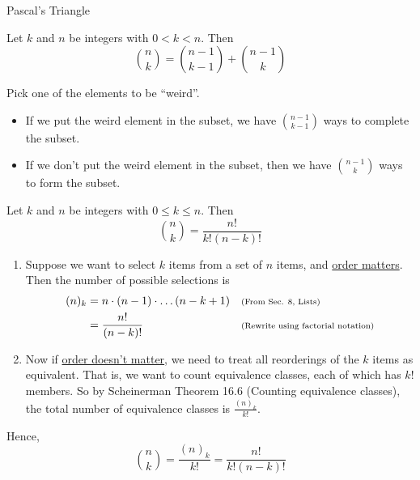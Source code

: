 \documentclass[10pt]{beamer}
\begin{document}
\begin{frame}{Pascal's Triangle}
\footnotesize 
\begin{mygreenbox}[title=\text{Pascal's Identity}]
Let $k$ and $n$ be integers with $0 < k <n$. Then
\[ \binom{n}{k} =\binom{n-1}{k-1} + \binom{n-1}{k} \]
\end{mygreenbox}
\vfill 
\begin{myyellowbox}[title=\text{Poll: What is the intuition?}]
\pause 
Pick one of the elements to be \enquote{weird}. 
\begin{itemize}
\item If we put the weird element in the subset, we have  $\binom{n-1}{k-1}$ ways to complete the subset.
\item If we don't put the weird element in the subset, then we have $ \binom{n-1}{k}$ ways to form the subset.
\end{itemize}

\end{myyellowbox}

\end{frame}


\begin{frame}
\footnotesize 
\begin{mygreenbox}[title=\text{Scheinerman Thm 17.12: \quad Formula for $\binom{n}{k}$}]
Let $k$ and $n$ be integers with $0 \leq  k  \leq n$. Then
\[ \binom{n}{k} = \frac{n!}{k! (n-k)!} \]
\end{mygreenbox}
\vfill 
\begin{myyellowbox}[title=\text{Poll: How to understand this formula?}]
\pause 
\begin{enumerate} \footnotesize 
	\item Suppose we want to select $k$ items from a set of $n$ items, and \underline{order matters}.  Then the number of possible selections is
	\begin{align*}
	(n)_k & = n \cdot (n-1) \cdot \hdots (n-k+1) && \text{\scriptsize{{(From Sec. 8, Lists)}}} \\
	&= \frac{n!}{(n-k)!} && \text{\scriptsize{{(Rewrite using factorial notation)}}}
	\end{align*}
	\item Now if \underline{order doesn't matter}, we \pause  need to treat all reorderings of the $k$ items as equivalent.  That is, we want to count equivalence classes, each of which has $k!$ members.  So by Scheinerman Theorem 16.6 (Counting equivalence classes), the total number of equivalence classes is $\frac{(n)_k}{k!}$.
\end{enumerate}
\footnotesize 
Hence, 
\[ \binom{n}{k} = \frac{(n)_k}{k!} = \frac{n!}{k! (n-k)!} \]
\end{myyellowbox}

\end{frame}
\end{document}
